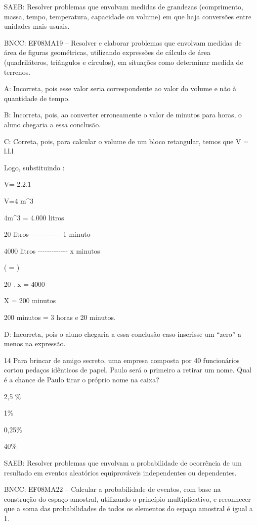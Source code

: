 {SAEB: Resolver problemas que envolvam medidas de grandezas (comprimento,
massa, tempo, temperatura, capacidade ou volume) em que haja conversões
entre unidades mais usuais.

BNCC: EF08MA19 -- Resolver e elaborar problemas que envolvam medidas de
área de figuras geométricas, utilizando expressões de cálculo de área
(quadriláteros, triângulos e círculos), em situações como determinar
medida de terrenos.

A: Incorreta, pois esse valor seria correspondente ao valor do volume e
não à quantidade de tempo.

B: Incorreta, pois, ao converter erroneamente o valor de minutos para
horas, o aluno chegaria a essa conclusão.

C: Correta, pois, para calcular o volume de um bloco retangular, temos
que V = l.l.l

Logo, substituindo :

V= 2.2.1

V=4 m^3

4m^3 = 4.000 litros

20 litros -\/-\/-\/-\/-\/-\/-\/-\/-\/-\/-\/-\/- 1 minuto

4000 litros -\/-\/-\/-\/-\/-\/-\/-\/-\/-\/-\/-\/- x minutos

( = )

20 . x = 4000

X = 200 minutos

200 minutos = 3 horas e 20 minutos.

D: Incorreta, pois o aluno chegaria a essa conclusão caso inserisse um
``zero'' a menos na expressão.

\num{14} Para brincar de amigo secreto, uma empresa composta por 40
funcionários cortou pedaços idênticos de papel. Paulo será o primeiro a
retirar um nome. Qual é a chance de Paulo tirar o próprio nome na caixa?
\item 2,5 \%
\item 1\%
\item 0,25\%
\item 40\%

SAEB: Resolver problemas que envolvam a probabilidade de ocorrência de
um resultado em eventos aleatórios equiprováveis independentes ou
dependentes.

BNCC: EF08MA22 -- Calcular a probabilidade de eventos, com base na
construção do espaço amostral, utilizando o princípio multiplicativo, e
reconhecer que a soma das probabilidades de todos os elementos do espaço
amostral é igual a 1.

}
